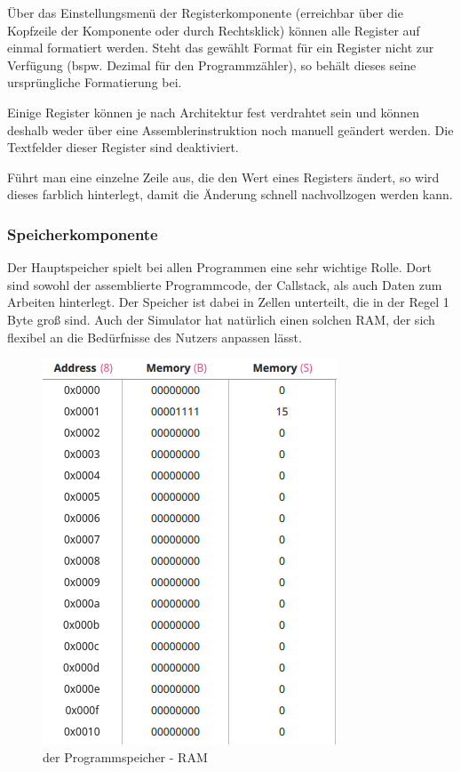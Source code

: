 Über das Einstellungsmenü der Registerkomponente (erreichbar über die Kopfzeile der Komponente oder durch Rechtsklick) können alle Register auf einmal formatiert werden. Steht das gewählt Format für ein Register nicht zur Verfügung (bspw. Dezimal für den Programmzähler), so behält dieses seine ursprüngliche Formatierung bei.

Einige Register können je nach Architektur fest verdrahtet sein und können deshalb weder über eine Assemblerinstruktion noch manuell geändert werden. Die Textfelder dieser Register sind deaktiviert.

Führt man eine einzelne Zeile aus, die den Wert eines Registers ändert, so wird dieses farblich hinterlegt, damit die Änderung schnell nachvollzogen werden kann.


\subsubsection{Speicherkomponente}
Der Hauptspeicher spielt bei allen Programmen eine sehr wichtige Rolle.
Dort sind sowohl der assemblierte Programmcode, der Callstack, als auch Daten zum Arbeiten hinterlegt.
Der Speicher ist dabei in Zellen unterteilt, die in der Regel 1 Byte groß sind.
Auch der Simulator hat natürlich einen solchen RAM, der sich flexibel an die Bedürfnisse des Nutzers anpassen lässt.

\begin{figure}[ht]
	\centering
  \includegraphics[scale=1]{Images/Memory}
	\caption{der Programmspeicher - RAM}
	\label{Memory}
\end{figure}

